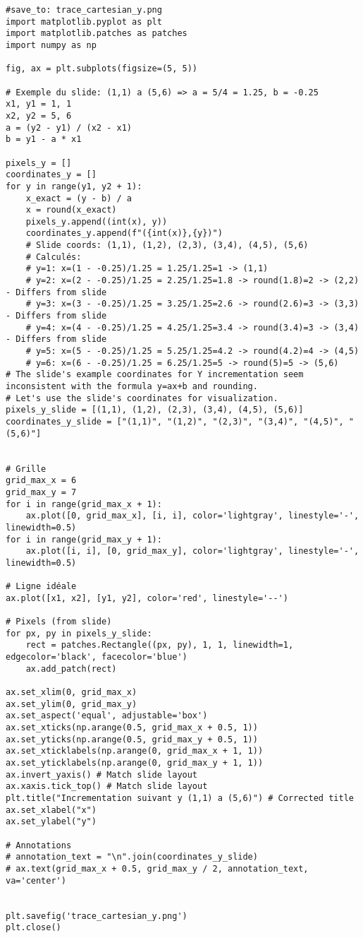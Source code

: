 \documentclass{article}
\begin{document}
\begin{verbatim}
#save_to: trace_cartesian_y.png
import matplotlib.pyplot as plt
import matplotlib.patches as patches
import numpy as np

fig, ax = plt.subplots(figsize=(5, 5))

# Exemple du slide: (1,1) a (5,6) => a = 5/4 = 1.25, b = -0.25
x1, y1 = 1, 1
x2, y2 = 5, 6
a = (y2 - y1) / (x2 - x1)
b = y1 - a * x1

pixels_y = []
coordinates_y = []
for y in range(y1, y2 + 1):
    x_exact = (y - b) / a
    x = round(x_exact)
    pixels_y.append((int(x), y))
    coordinates_y.append(f"({int(x)},{y})")
    # Slide coords: (1,1), (1,2), (2,3), (3,4), (4,5), (5,6)
    # Calculés:
    # y=1: x=(1 - -0.25)/1.25 = 1.25/1.25=1 -> (1,1)
    # y=2: x=(2 - -0.25)/1.25 = 2.25/1.25=1.8 -> round(1.8)=2 -> (2,2) - Differs from slide
    # y=3: x=(3 - -0.25)/1.25 = 3.25/1.25=2.6 -> round(2.6)=3 -> (3,3) - Differs from slide
    # y=4: x=(4 - -0.25)/1.25 = 4.25/1.25=3.4 -> round(3.4)=3 -> (3,4) - Differs from slide
    # y=5: x=(5 - -0.25)/1.25 = 5.25/1.25=4.2 -> round(4.2)=4 -> (4,5)
    # y=6: x=(6 - -0.25)/1.25 = 6.25/1.25=5 -> round(5)=5 -> (5,6)
# The slide's example coordinates for Y incrementation seem inconsistent with the formula y=ax+b and rounding.
# Let's use the slide's coordinates for visualization.
pixels_y_slide = [(1,1), (1,2), (2,3), (3,4), (4,5), (5,6)]
coordinates_y_slide = ["(1,1)", "(1,2)", "(2,3)", "(3,4)", "(4,5)", "(5,6)"]


# Grille
grid_max_x = 6
grid_max_y = 7
for i in range(grid_max_x + 1):
    ax.plot([0, grid_max_x], [i, i], color='lightgray', linestyle='-', linewidth=0.5)
for i in range(grid_max_y + 1):
    ax.plot([i, i], [0, grid_max_y], color='lightgray', linestyle='-', linewidth=0.5)

# Ligne idéale
ax.plot([x1, x2], [y1, y2], color='red', linestyle='--')

# Pixels (from slide)
for px, py in pixels_y_slide:
    rect = patches.Rectangle((px, py), 1, 1, linewidth=1, edgecolor='black', facecolor='blue')
    ax.add_patch(rect)

ax.set_xlim(0, grid_max_x)
ax.set_ylim(0, grid_max_y)
ax.set_aspect('equal', adjustable='box')
ax.set_xticks(np.arange(0.5, grid_max_x + 0.5, 1))
ax.set_yticks(np.arange(0.5, grid_max_y + 0.5, 1))
ax.set_xticklabels(np.arange(0, grid_max_x + 1, 1))
ax.set_yticklabels(np.arange(0, grid_max_y + 1, 1))
ax.invert_yaxis() # Match slide layout
ax.xaxis.tick_top() # Match slide layout
plt.title("Incrementation suivant y (1,1) a (5,6)") # Corrected title
ax.set_xlabel("x")
ax.set_ylabel("y")

# Annotations
# annotation_text = "\n".join(coordinates_y_slide)
# ax.text(grid_max_x + 0.5, grid_max_y / 2, annotation_text, va='center')


plt.savefig('trace_cartesian_y.png')
plt.close()
\end{verbatim}
\end{document}
